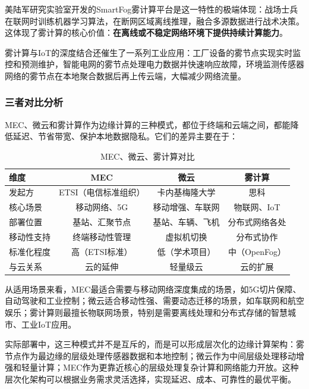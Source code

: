 美陆军研究实验室开发的SmartFog雾计算平台是这一特性的极端体现：战场士兵在联网时训练机器学习算法，在断网区域离线推理，融合多源数据进行战术决策。这体现了雾计算的核心价值：\textbf{在离线或不稳定网络环境下提供持续计算能力}。

雾计算与IoT的深度结合还催生了一系列工业应用：工厂设备的雾节点实现实时监控和预测维护，智能电网的雾节点处理电力数据并快速响应故障，环境监测传感器网络的雾节点在本地聚合数据后再上传云端，大幅减少网络流量。

\subsubsection{三者对比分析}

MEC、微云和雾计算作为边缘计算的三种模式，都位于终端和云端之间，都能降低延迟、节省带宽、保护本地数据隐私。它们的差异主要在于：

\begin{table}[htbp]
\centering
\caption{MEC、微云、雾计算对比}
\begin{tabular}{|l|c|c|c|}
\hline
\textbf{维度} & \textbf{MEC} & \textbf{微云} & \textbf{雾计算} \\
\hline
发起方 & ETSI（电信标准组织） & 卡内基梅隆大学 & 思科 \\
核心场景 & 移动网络、5G & 移动增强、车联网 & 物联网、IoT \\
部署位置 & 基站、汇聚节点 & 基站、车辆、飞机 & 分布式网络各处 \\
移动性支持 & 终端移动性管理 & 虚拟机切换 & 分布式协作 \\
标准化程度 & 高（ETSI标准） & 低（学术项目） & 中（OpenFog） \\
与云关系 & 云的延伸 & 轻量级云 & 云的扩展 \\
\hline
\end{tabular}
\end{table}

从适用场景来看，MEC最适合需要与移动网络深度集成的场景，如5G切片保障、自动驾驶和工业控制；微云适合移动性强、需要动态迁移的场景，如车联网和航空娱乐；雾计算则最擅长物联网场景，特别是需要离线处理和分布式存储的智慧城市、工业IoT应用。

\begin{insightbox}[边缘计算的层次化]
实际部署中，这三种模式并不是互斥的，而是可以形成层次化的边缘计算架构：雾节点作为最边缘的层级处理传感器数据和本地控制；微云作为中间层级处理移动增强和轻量计算；MEC作为更靠近核心的层级处理复杂计算和网络能力开放。这种层次化架构可以根据业务需求灵活选择，实现延迟、成本、可靠性的最优平衡。
\end{insightbox}

